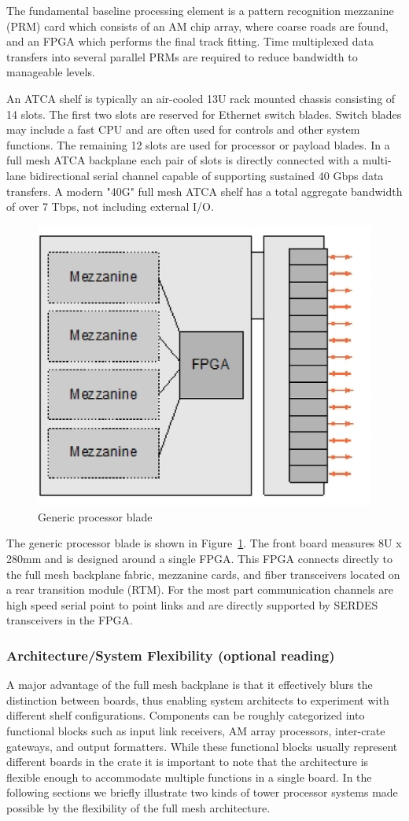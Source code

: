 \noindent The fundamental baseline processing element is a pattern recognition mezzanine (PRM) card which consists of an AM chip array, where coarse roads are found, and an FPGA which performs the final track fitting. Time multiplexed data transfers into several parallel PRMs are required to reduce bandwidth to manageable levels.

\noindent An ATCA shelf is typically an air-cooled 13U rack mounted chassis consisting of 14 slots.  The first two slots are reserved for Ethernet switch blades.  Switch blades may include a fast CPU and are often used for controls and other system functions.  The remaining 12 slots are used for processor or payload blades.  In a full mesh ATCA backplane each pair of slots is directly connected with a multi-lane bidirectional serial channel capable of supporting sustained 40 Gbps data transfers.  A modern "40G" full mesh ATCA shelf has a total aggregate bandwidth of over 7 Tbps, not including external I/O.

\begin{figure}[ht!]
\centering
\includegraphics[width=0.45\columnwidth]{Plots/ProcBlade.eps}
\caption{Generic processor blade}
\label{fig:ProcBlade}
\end{figure}

\noindent The generic processor blade is shown in Figure~\ref{fig:ProcBlade}.  The front board measures 8U x 280mm and is designed around a single FPGA.  This FPGA connects directly to the full mesh backplane fabric, mezzanine cards, and fiber transceivers located on a rear transition module (RTM).  For the most part communication channels are high speed serial point to point links and are directly supported by SERDES transceivers in the FPGA.   

\subsubsection{Architecture/System Flexibility (optional reading)}

\noindent A major advantage of the full mesh backplane is that it effectively blurs the distinction between boards, thus enabling system architects to experiment with different shelf configurations.  Components can be roughly categorized into functional blocks such as input link receivers, AM array processors, inter-crate gateways, and output formatters.  While these functional blocks usually represent different boards in the crate it is important to note that the architecture is flexible enough to accommodate multiple functions in a single board.  In the following sections we briefly illustrate two kinds of tower processor systems made possible by the flexibility of the full mesh architecture.

